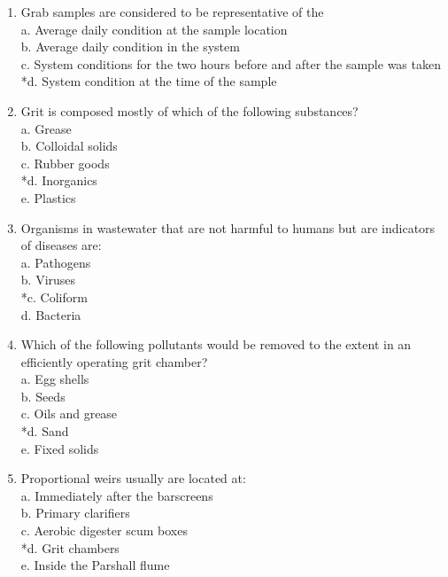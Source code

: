 \begin{enumerate}
\vspace{0.4cm}
\item Grab samples are considered to be representative of the \\

a. Average daily condition at the sample location \\
b. Average daily condition in the system \\
c. System conditions for the two hours before and after the sample was taken \\
*d. System condition at the time of the sample 

\vspace{0.4cm}
\item Grit is composed mostly of which of the following substances? \\

a. Grease \\
b. Colloidal solids \\
c. Rubber goods \\
*d. Inorganics \\
e. Plastics 

\vspace{0.4cm}
\item Organisms in wastewater that are not harmful to humans but are indicators of diseases are: \\

a. Pathogens \\
b. Viruses \\
*c. Coliform \\
d. Bacteria 

\vspace{0.4cm}
\item Which of the following pollutants would be removed to the extent in an efficiently operating grit chamber? \\

a. Egg shells \\
b. Seeds \\
c. Oils and grease \\
*d. Sand \\
e. Fixed solids 

\vspace{0.4cm}
\item Proportional weirs usually are located at: \\

a. Immediately after the barscreens \\
b. Primary clarifiers \\
c. Aerobic digester scum boxes \\
*d. Grit chambers \\
e. Inside the Parshall flume 


\end{enumerate}
